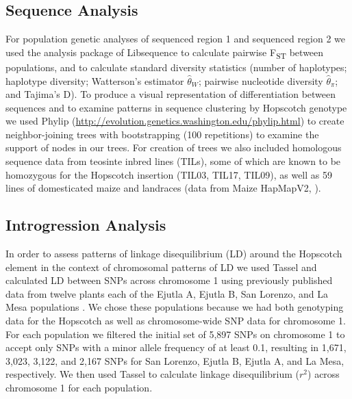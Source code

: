 \documentclass[12pt]{article}
\begin{document}
\subsection*{Sequence Analysis}

For population genetic analyses of sequenced region 1 and sequenced region 2 we used the analysis package of Libsequence \citep{Thornton2003} to calculate pairwise F\textsubscript{ST} between populations, and to calculate standard diversity statistics (number of haplotypes; haplotype diversity; Watterson's estimator $\hat\theta_W$; pairwise nucleotide diversity $\hat\theta_\pi$; and Tajima's D). To produce a visual representation of differentiation between sequences and to examine patterns in sequence clustering by Hopscotch genotype we used Phylip (\url{http://evolution.genetics.washington.edu/phylip.html}) to create neighbor-joining trees with bootstrapping (100 repetitions) to examine the support of nodes in our trees. For creation of trees we also included homologous sequence data from teosinte inbred lines (TILs), some of which are known to be homozygous for the Hopscotch insertion (TIL03, TIL17, TIL09), as well as 59 lines of domesticated maize and landraces (data from Maize HapMapV2, \citep{Chia2012}).


\subsection*{Introgression Analysis}

In order to assess patterns of linkage disequilibrium (LD) around the Hopscotch element in the context of chromosomal patterns of LD we used Tassel \citep{Bradbury2007} and calculated LD between SNPs across chromosome 1 using previously published data from twelve plants each of the Ejutla A, Ejutla B, San Lorenzo, and La Mesa populations \citep{Pyhajarvi2013}. We chose these populations because we had both genotyping data for the Hopscotch as well as chromosome-wide SNP data for chromosome 1. For each population we filtered the initial set of 5,897 SNPs on chromosome 1 to accept only SNPs with a minor allele frequency of at least 0.1, resulting in 1,671, 3,023, 3,122, and 2,167 SNPs for San Lorenzo, Ejutla B, Ejutla A, and La Mesa, respectively. We then used Tassel \citep{Bradbury2007} to calculate linkage disequilibrium ($r^{2}$) across chromosome 1 for each population. 
\end{document}
